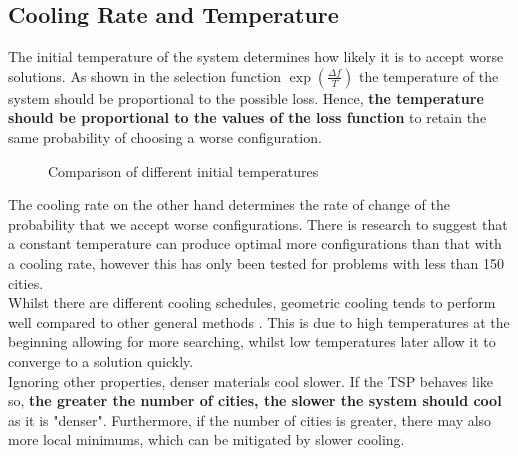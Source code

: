 \documentclass{article}
\begin{document}
\subsection{Cooling Rate and Temperature}

The initial temperature of the system determines how likely it is to accept worse solutions.
As shown in the selection function $\exp(\frac{\Delta f}{T})$ the temperature of the system should be proportional to the possible loss.
Hence, \textbf{the temperature should be proportional to the values of the loss function} to retain the same probability of choosing a worse configuration.

\begin{figure}[H]
    \centering
    \caption{Comparison of different initial temperatures}
\end{figure}


The cooling rate on the other hand determines the rate of change of the probability that we accept worse configurations.
There is research \cite{fixed-temperature} to suggest that a constant temperature can produce optimal more configurations than that with a cooling rate, however this has only been tested for problems with less than 150 cities.
\\

Whilst there are different cooling schedules, geometric cooling tends to perform well compared to other general methods \cite{cooling-schedule}.
This is due to high temperatures at the beginning allowing for more searching, whilst low temperatures later allow it to converge to a solution quickly.
\\

Ignoring other properties, denser materials cool slower.
If the TSP behaves like so, \textbf{the greater the number of cities, the slower the system should cool} as it is "denser".
Furthermore, if the number of cities is greater, there may also more local minimums, which can be mitigated by slower cooling.
\end{document}
